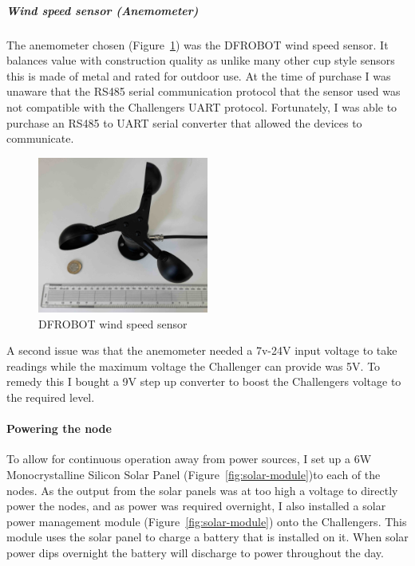 \subparagraph{Wind speed sensor (Anemometer)}\label{sec:anemometer}



The anemometer chosen (Figure~\ref{fig:wind-sensor}) was the DFROBOT wind speed
sensor. It balances value with construction quality as unlike many other cup
style sensors this is made of metal and rated for outdoor use. At the time of
purchase I was unaware that the RS485 serial communication protocol that the
sensor used was not compatible with the Challengers UART protocol. Fortunately,
I was able to purchase an RS485 to UART serial converter that allowed the
devices to communicate.

\begin{figure}[H]
    \centering
    \includegraphics[width=0.5\textwidth]{contents/part-2/fig2/wind-sensor.jpg}
    \caption{DFROBOT wind speed sensor}
    \label{fig:wind-sensor}
\end{figure}

A second issue was that the anemometer needed a 7v-24V input voltage to take
readings while the maximum voltage the Challenger can provide was 5V. To remedy
this I bought a 9V step up converter to boost the Challengers voltage to the
required level.

\paragraph{Powering the node}

To allow for continuous operation away from power sources, I set up a 6W
Monocrystalline Silicon Solar Panel (Figure~\ref{fig:solar-module})to each of
the nodes. As the output from the solar panels was at too high a voltage to
directly power the nodes, and as power was required overnight, I also installed
a solar power management module (Figure~\ref{fig:solar-module}) onto the
Challengers. This module uses the solar panel to charge a battery that is
installed on it. When solar power dips overnight the battery will discharge to
power throughout the day.

